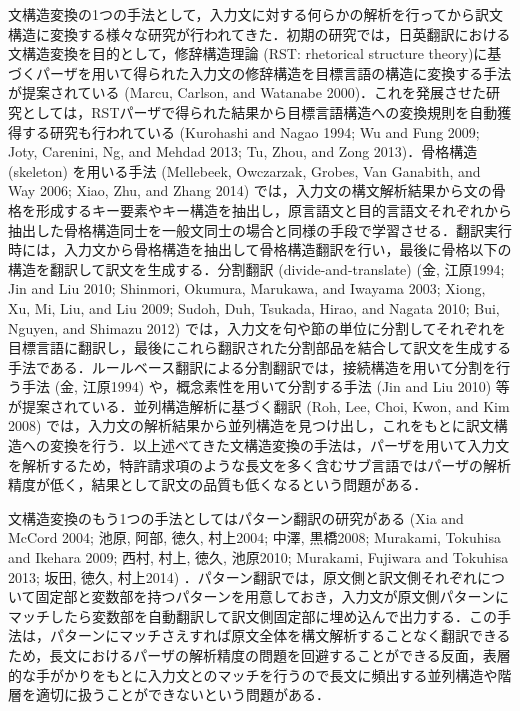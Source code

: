 \documentclass[japanese]{jnlp_1.4}
\begin{document}
文構造変換の1つの手法として，入力文に対する何らかの解析を行ってから訳文構造に変換する様々な研究が行われてきた．初期の研究では，日英翻訳における文構造変換を目的として，修辞構造理論 (RST: 
rhetorical structure 
theory)に基づくパーザを用いて得られた入力文の修辞構造を目標言語の構造に変換する手法が提案されている (Marcu, 
Carlson, and Watanabe 
2000)．これを発展させた研究としては，RSTパーザで得られた結果から目標言語構造への変換規則を自動獲得する研究も行われている (Kurohashi 
and Nagao 1994; Wu and Fung 2009; Joty, Carenini, Ng, and Mehdad 2013; Tu, 
Zhou, and Zong 2013)．骨格構造 (skeleton) を用いる手法 (Mellebeek, 
Owczarzak, Grobes, Van Ganabith, and Way 2006; Xiao, Zhu, and Zhang 
2014) では，入力文の構文解析結果から文の骨格を形成するキー要素やキー構造を抽出し，原言語文と目的言語文それぞれから抽出した骨格構造同士を一般文同士の場合と同様の手段で学習させる．翻訳実行時には，入力文から骨格構造を抽出して骨格構造翻訳を行い，最後に骨格以下の構造を翻訳して訳文を生成する．分割翻訳 (divide-and-translate) (金, 
江原1994; Jin and Liu 2010; Shinmori, Okumura, Marukawa, and Iwayama 2003; 
Xiong, Xu, Mi, Liu, and Liu 2009; Sudoh, Duh, Tsukada, Hirao, and Nagata 
2010; Bui, Nguyen, and Shimazu 
2012) では，入力文を句や節の単位に分割してそれぞれを目標言語に翻訳し，最後にこれら翻訳された分割部品を結合して訳文を生成する手法である．ルールベース翻訳による分割翻訳では，接続構造を用いて分割を行う手法 (金, 
江原1994) や，概念素性を用いて分割する手法 (Jin and Liu 
2010) 等が提案されている．並列構造解析に基づく翻訳 (Roh, Lee, Choi, Kwon, 
and Kim 
2008) では，入力文の解析結果から並列構造を見つけ出し，これをもとに訳文構造への変換を行う．以上述べてきた文構造変換の手法は，パーザを用いて入力文を解析するため，特許請求項のような長文を多く含むサブ言語ではパーザの解析精度が低く，結果として訳文の品質も低くなるという問題がある．

文構造変換のもう1つの手法としてはパターン翻訳の研究がある (Xia and McCord 
2004; 池原, 阿部, 徳久, 村上2004; 中澤, 黒橋2008; Murakami, Tokuhisa and 
Ikehara 2009; 西村, 村上, 徳久, 池原2010; Murakami, Fujiwara and Tokuhisa 
2013; 坂田, 徳久, 
村上2014) ．パターン翻訳では，原文側と訳文側それぞれについて固定部と変数部を持つパターンを用意しておき，入力文が原文側パターンにマッチしたら変数部を自動翻訳して訳文側固定部に埋め込んで出力する．この手法は，パターンにマッチさえすれば原文全体を構文解析することなく翻訳できるため，長文におけるパーザの解析精度の問題を回避することができる反面，表層的な手がかりをもとに入力文とのマッチを行うので長文に頻出する並列構造や階層を適切に扱うことができないという問題がある．
\end{document}
